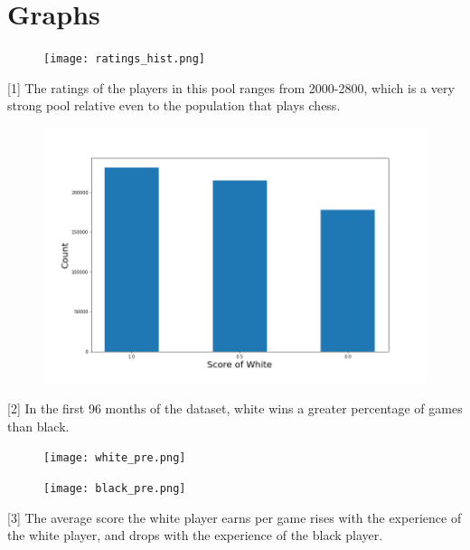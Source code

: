 \documentclass[12pt, letterpaper]{article}
\begin{document}
\section*{Graphs}

\begin{figure}[hbp]

	\centering
	
	\texttt{[image: ratings\_hist.png]}
	
\end{figure}

[1] The ratings of the players in this pool ranges from 2000-2800, which is a very strong pool relative even to the population that plays chess.

\pagebreak

\begin{figure}[hbp]

	\centering 
	
	\includegraphics[width=\linewidth]{white_win.png}

\end{figure}

[2] In the first 96 months of the dataset, white wins a greater percentage of games than black.

\pagebreak

\begin{figure}[hbp]

	\centering
		
	\texttt{[image: white\_pre.png]}
	
	\texttt{[image: black\_pre.png]}
	
\end{figure}

[3] The average score the white player earns per game rises with the experience of the white player, and drops with the experience of the black player.
\end{document}
